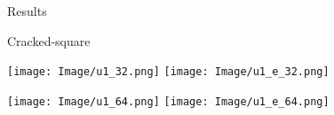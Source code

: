 \documentclass[13pt]{beamer}
\begin{document}
\begin{frame}[shrink=5]{Results}
  \begin{block}{}
  Cracked-square
   \begin{center}
     \texttt{[image: Image/u1\_32.png]}
     \texttt{[image: Image/u1\_e\_32.png]}
   \end{center}
   \begin{center}
     \texttt{[image: Image/u1\_64.png]}
     \texttt{[image: Image/u1\_e\_64.png]}
   \end{center}
  \end{block}
\end{frame}
\end{document}
